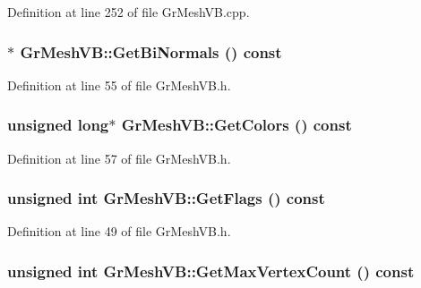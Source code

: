 Definition at line 252 of file GrMeshVB.cpp.\hypertarget{class_gr_mesh_v_b_f52a7b54ced28a889947a58929290d1e}{
\subsubsection[{GetBiNormals}]{$\ast$ GrMeshVB::GetBiNormals () const}}
\label{class_gr_mesh_v_b_f52a7b54ced28a889947a58929290d1e}




Definition at line 55 of file GrMeshVB.h.\hypertarget{class_gr_mesh_v_b_0caa0721a0588ac2a22980ba8059d8a9}{
\subsubsection[{GetColors}]{\setlength{\rightskip}{0pt plus 5cm}unsigned long$\ast$ GrMeshVB::GetColors () const}}
\label{class_gr_mesh_v_b_0caa0721a0588ac2a22980ba8059d8a9}




Definition at line 57 of file GrMeshVB.h.\hypertarget{class_gr_mesh_v_b_81536894ff71ce167c18ca1067e85f63}{
\subsubsection[{GetFlags}]{\setlength{\rightskip}{0pt plus 5cm}unsigned int GrMeshVB::GetFlags () const}}
\label{class_gr_mesh_v_b_81536894ff71ce167c18ca1067e85f63}




Definition at line 49 of file GrMeshVB.h.\hypertarget{class_gr_mesh_v_b_44d690384a6aa9f08cf5a9dc9916cf53}{
\subsubsection[{GetMaxVertexCount}]{\setlength{\rightskip}{0pt plus 5cm}unsigned int GrMeshVB::GetMaxVertexCount () const}}
\label{class_gr_mesh_v_b_44d690384a6aa9f08cf5a9dc9916cf53}




